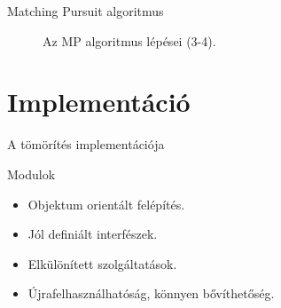 \documentclass{beamer}
\begin{document}
\begin{frame}{Matching Pursuit algoritmus}
{\begin{figure}[htb!]
\caption{Az MP algoritmus lépései (3-4).}
\end{figure}
}
\end{frame}

\section{Implementáció}
\label{tab:implemenation}

\begin{frame}{A tömörítés implementációja}
\linespread{0.8}
\small
\vspace{-2mm}
\begin{block}{Modulok}
	\begin{itemize}
		\item Objektum orientált felépítés.
		\item Jól definiált interfészek.
		\item Elkülönített szolgáltatások.
		\item Újrafelhasználhatóság, könnyen bővíthetőség.
	\end{itemize}
	\end{block}		
	
\end{frame}
\end{document}
